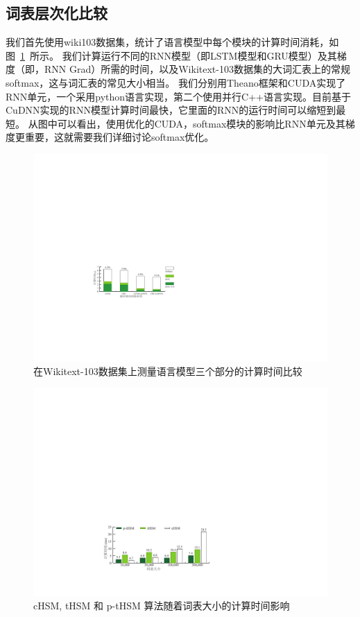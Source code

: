 \subsection{词表层次化比较}
我们首先使用wiki103数据集，统计了语言模型中每个模块的计算时间消耗，如图~\ref{fig:rnn_timing}~所示。 我们计算运行不同的RNN模型（即LSTM模型和GRU模型）及其梯度（即，RNN Grad）所需的时间，以及Wikitext-103数据集的大词汇表上的常规softmax，这与词汇表的常见大小相当。 我们分别用Theano框架和CUDA实现了RNN单元，一个采用python语言实现，第二个使用并行C++语言实现。目前基于CuDNN实现的RNN模型计算时间最快，它里面的RNN的运行时间可以缩短到最短。 从图中可以看出，使用优化的CUDA，softmax模块的影响比RNN单元及其梯度更重要，这就需要我们详细讨论softmax优化。
\begin{figure}[!ht]
  \centering
  \includegraphics[width=0.8\columnwidth]{./figures/rnn_timing.pdf}
  \caption{在Wikitext-103数据集上测量语言模型三个部分的计算时间比较}\label{fig:rnn_timing}
\end{figure}
\begin{figure}[!ht]
  \centering
  \includegraphics[width=0.8\columnwidth]{./figures/all_time.pdf}
  \caption{cHSM, tHSM 和 p-tHSM 算法随着词表大小的计算时间影响}\label{fig:hsm_benchmark}
\end{figure}


